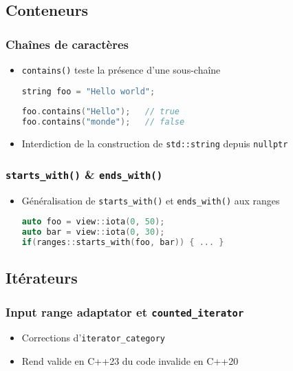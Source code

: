 \documentclass[C++.tex]{subfiles}
\begin{document}
\subsection*{Conteneurs}
\begin{frame}[fragile]
	\frametitle{Chaînes de caractères}
	\begin{itemize}
		\item \lstinline|contains()| teste la présence d'une sous-chaîne

		\begin{lstlisting}[language=C++]
string foo = "Hello world";
	
foo.contains("Hello");   // true
foo.contains("monde");   // false\end{lstlisting}


		\item Interdiction de la construction de \lstinline|std::string| depuis \lstinline|nullptr|

	\end{itemize}
\end{frame}

\begin{frame}[fragile]
	\frametitle{\lstinline|starts_with()| \& \lstinline|ends_with()|}
	\begin{itemize}
		\item Généralisation de \lstinline|starts_with()| et \lstinline|ends_with()| aux ranges

		\begin{lstlisting}[language=C++]
auto foo = view::iota(0, 50);
auto bar = view::iota(0, 30);
if(ranges::starts_with(foo, bar)) { ... }\end{lstlisting}
	\end{itemize}
\end{frame}

\subsection*{Itérateurs}
\begin{frame}[fragile]
	\frametitle{Input range adaptator et \lstinline|counted_iterator|}
	\begin{itemize}
		\item Corrections d'\lstinline|iterator_category|
		\item Rend valide en C++23 du code invalide en C++20
	\end{itemize}
\end{frame}
\end{document}
